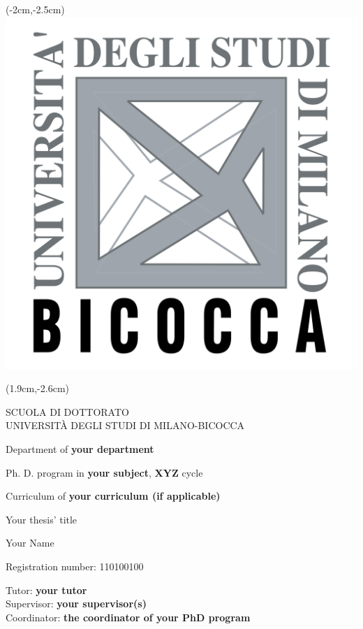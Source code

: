 \documentclass{report}
\newcommand{\alert}[1]{{\color{red} #1}}
\begin{document}

\thispagestyle{empty}
\begin{textblock*}{\textwidth}(-2cm,-2.5cm)
\includegraphics[height=0.1\paperheight]{logos/Bicocca_transparent.png}	
\end{textblock*}
\begin{textblock*}{\textwidth}(1.9cm,-2.6cm)
\begin{flushleft}
{\color{red}\Large{SCUOLA DI DOTTORATO}}\\[2mm]
{\color{red}\large{UNIVERSIT\`A DEGLI STUDI DI MILANO-BICOCCA}}
\end{flushleft}
\end{textblock*}
\vspace{2cm}
\centerline{\Large{Department of \textbf{\alert{your department}}}}
\vspace{0.5cm}
\centerline{\Large{Ph. D. program in \textbf{\alert{your subject}}, \alert{\textbf{XYZ}} cycle}}
\vspace{2mm}
\centerline{\Large{Curriculum of \alert{\textbf{your curriculum (if applicable)}}}}
\vspace{2cm}
\centerline{\huge{Your thesis' title}}
\vspace{2cm}
\centerline{\LARGE{Your Name}}
\vspace{2mm}
\centerline{\Large{Registration number: 110100100}}
\vspace{2cm}
\begin{flushleft}
\LARGE{Tutor: \alert{\textbf{your tutor}}}\\[1.5mm]
\LARGE{Supervisor: \alert{\textbf{your supervisor(s)}}}\\[2cm]
\LARGE{Coordinator: \alert{\textbf{the coordinator of your PhD program}}}
\end{flushleft}
\vfill
\end{document}
